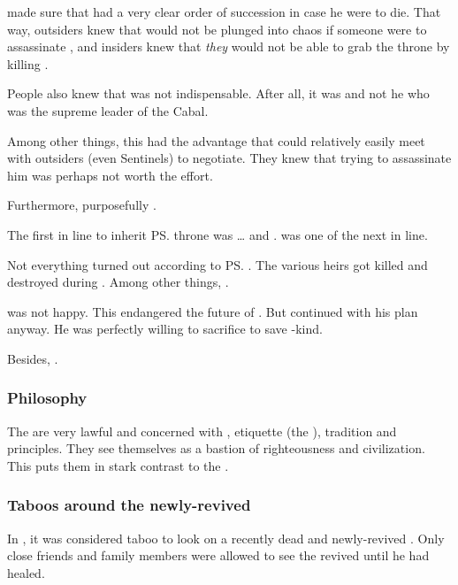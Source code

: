  made sure that \CiriathSepher{} had a very clear order of succession in case he were to die. 
That way, outsiders knew that \CiriathSepher{} would not be plunged into chaos if someone were to assassinate \Azraid, and insiders knew that \emph{they} would not be able to grab the throne by killing \Azraid. 

People also knew that \Azraid{} was not indispensable. 
After all, it was  and not he who was the supreme leader of the Cabal. 

Among other things, this had the advantage that \Azraid{} could relatively easily meet with outsiders (even Sentinels) to negotiate. 
They knew that trying to assassinate him was perhaps not worth the effort. 

Furthermore, {\Azraid} purposefully . 

The first in line to inherit \ps{\Azraid} throne was \ldots{} and . 
 was one of the next in line. 

Not everything turned out according to \ps{\Azraid} . 
The various heirs got killed and destroyed during \SentinelsofMithEmph. 
Among other things, . 

\Azraid{} was not happy. 
This endangered the future of \CiriathSepher. 
But \Azraid{} continued with his plan anyway. 
He was perfectly willing to sacrifice \CiriathSepher{} to save \resphan-kind. 

Besides, . 





\subsubsection{Philosophy}
The \KiriathSepher{} are very lawful and concerned with \honour, etiquette (the ), tradition and principles. 
They see themselves as a bastion of righteousness and civilization. 
This puts them in stark contrast to the \Mystraacht. 





\subsubsection{Taboos around the newly-revived}
In \CiriathSepher, it was considered taboo to look on a recently dead and newly-revived \resphan.
Only close friends and family members were allowed to see the revived until he had healed. 

